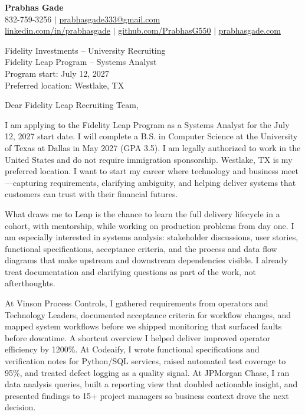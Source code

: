 \documentclass[letterpaper,11pt]{letter}
\begin{document}
\begin{flushleft}
\textbf{\large Prabhas Gade}\\
832-759-3256 $|$ \href{mailto:prabhasgade333@gmail.com}{prabhasgade333@gmail.com}\\
\href{https://linkedin.com/in/prabhasgade}{linkedin.com/in/prabhasgade} $|$
\href{https://github.com/PrabhasG550}{github.com/PrabhasG550} $|$
\href{https://prabhasgade.com}{prabhasgade.com}
\end{flushleft}

\vspace{6pt}
\begin{flushleft}
Fidelity Investments -- University Recruiting\\
Fidelity Leap Program -- Systems Analyst\\
Program start: July 12, 2027\\
Preferred location: Westlake, TX
\end{flushleft}

Dear Fidelity Leap Recruiting Team,

I am applying to the Fidelity Leap Program as a Systems Analyst for the July 12, 2027 start date. I will complete a B.S. in Computer Science at the University of Texas at Dallas in May 2027 (GPA 3.5). I am legally authorized to work in the United States and do not require immigration sponsorship. Westlake, TX is my preferred location. I want to start my career where technology and business meet---capturing requirements, clarifying ambiguity, and helping deliver systems that customers can trust with their financial futures.

What draws me to Leap is the chance to learn the full delivery lifecycle in a cohort, with mentorship, while working on production problems from day one. I am especially interested in systems analysis: stakeholder discussions, user stories, functional specifications, acceptance criteria, and the process and data flow diagrams that make upstream and downstream dependencies visible. I already treat documentation and clarifying questions as part of the work, not afterthoughts.

At Vinson Process Controls, I gathered requirements from operators and Technology Leaders, documented acceptance criteria for workflow changes, and mapped system workflows before we shipped monitoring that surfaced faults before downtime. A shortcut overview I helped deliver improved operator efficiency by 1200\%. At Codeaify, I wrote functional specifications and verification notes for Python/SQL services, raised automated test coverage to 95\%, and treated defect logging as a quality signal. At JPMorgan Chase, I ran data analysis queries, built a reporting view that doubled actionable insight, and presented findings to 15+ project managers so business context drove the next decision.
\end{document}
